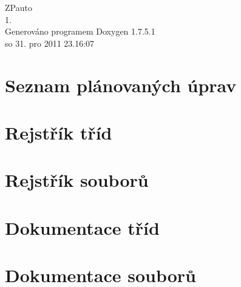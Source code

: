 \documentclass[a4paper]{book}
\begin{document}
\hypersetup{pageanchor=false,citecolor=blue}
\begin{titlepage}
\vspace*{7cm}
\begin{center}
{\Large \-Z\-Pauto \\[1ex]\large 1. }\\
\vspace*{1cm}
{\large \-Generováno programem Doxygen 1.7.5.1}\\
\vspace*{0.5cm}
{\small so 31. pro 2011 23.16:07}\\
\end{center}
\end{titlepage}
\clearemptydoublepage
{}
\tableofcontents
\clearemptydoublepage
{}
\hypersetup{pageanchor=true,citecolor=blue}
\chapter{\-Seznam plánovaných úprav}
\label{todo}
\hypertarget{todo}{}

\chapter{\-Rejstřík tříd}

\chapter{\-Rejstřík souborů}

\chapter{\-Dokumentace tříd}



\chapter{\-Dokumentace souborů}





\printindex
\end{document}
